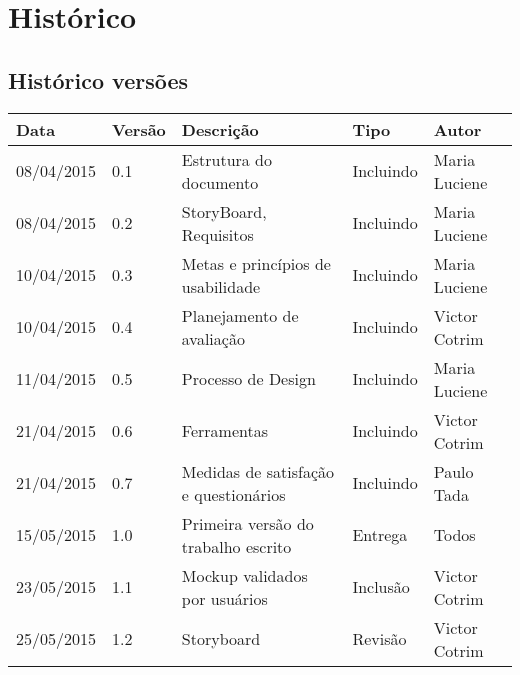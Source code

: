 \chapter[Histórico]{Histórico}

\section{Histórico versões}

\begin{table}[h]
	\centering
	\begin{tabular}{|l|l|l|l|l|}
		\hline
		Data & Versão & Descrição & Tipo & Autor \\ \hline
		08/04/2015 & 0.1 & Estrutura do documento & Incluindo & Maria Luciene \\ \hline
		08/04/2015 & 0.2 & StoryBoard, Requisitos & Incluindo & Maria Luciene \\ \hline
		10/04/2015 & 0.3 & Metas e princípios de usabilidade & Incluindo & Maria Luciene \\ \hline
		10/04/2015 & 0.4 & Planejamento de avaliação & Incluindo & Victor Cotrim \\ \hline
		11/04/2015 & 0.5 & Processo de Design & Incluindo & Maria Luciene \\ \hline	
		21/04/2015 & 0.6 & Ferramentas & Incluindo & Victor Cotrim \\ \hline
		21/04/2015 & 0.7 & Medidas de satisfação e questionários & Incluindo & Paulo Tada \\ \hline
		15/05/2015 & 1.0 & Primeira versão do trabalho escrito & Entrega & Todos \\ \hline
		23/05/2015 & 1.1 & Mockup validados por usuários & Inclusão & Victor Cotrim \\ \hline
		25/05/2015 & 1.2 & Storyboard & Revisão & Victor Cotrim \\ \hline


	\end{tabular}
\end{table}
